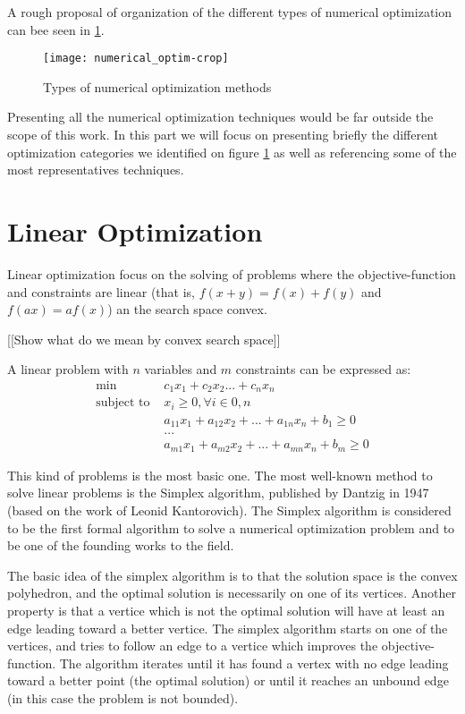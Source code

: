 A rough proposal of organization of the different types of numerical optimization can bee seen in \ref{numerical_optim_tree}.

\begin{figure}
\texttt{[image: numerical\_optim-crop]}
\caption{Types of numerical optimization methods}
\label{numerical_optim_tree}
\end{figure}

Presenting all the numerical optimization techniques would be far outside the scope of this work. In this part we will focus on presenting briefly the different optimization categories we identified on figure \ref{numerical_optim_tree} as well as referencing some of the most representatives techniques.



\section{Linear Optimization}

Linear optimization focus on the solving of problems where the objective-function and constraints are linear (that is, $f(x+y) = f(x)+f(y)$ and $f(ax) = af(x)$) an the search space convex.

[[Show what do we mean by convex search space]]

A linear problem with $n$ variables and $m$ constraints can be expressed as:
\begin{align*}
\text{min } & c_1x_1 + c_2x_2... + c_nx_n\\
\text{subject to } &x_i \geq 0, \forall i \in 0,n\\
&a_{11}x_1 + a_{12}x_2 + ... + a_{1n}x_n + b_1 \geq 0\\
&...\\
&a_{m1}x_1 + a_{m2}x_2 + ... + a_{mn}x_n + b_m \geq 0
\end{align*}

This kind of problems is the most basic one. The most well-known method to solve linear problems is the Simplex algorithm\cite{dantzig2003linear}, published by Dantzig in 1947 (based on the work of Leonid Kantorovich). The Simplex algorithm is considered to be the first formal algorithm to solve a numerical optimization problem and to be one of the founding works to the field.

The basic idea of the simplex algorithm is to that the solution space is the convex polyhedron, and the optimal solution is necessarily on one of its vertices. Another property is that a vertice which is not the optimal solution will have at least an edge leading toward a better vertice.
The simplex algorithm starts on one of the vertices, and tries to follow an edge to a vertice which improves the objective-function. The algorithm iterates until it has found a vertex with no edge leading toward a better point (the optimal solution) or until it reaches an unbound edge (in this case the problem is not bounded).

